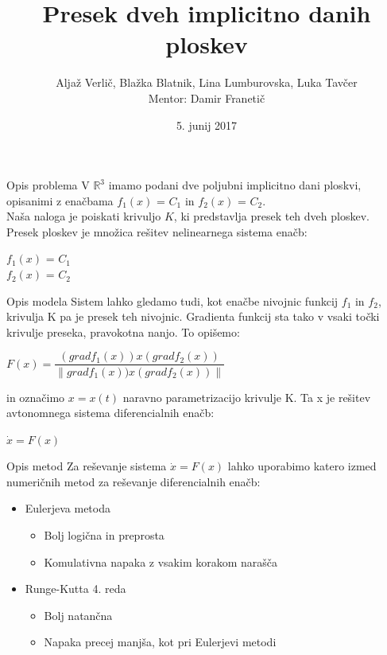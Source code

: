 \documentclass{beamer}
\title{Presek dveh implicitno danih ploskev}
\author[Avtorji]{Aljaž Verlič, Blažka Blatnik, Lina Lumburovska, Luka Tavčer\\
	Mentor: Damir Franetič}
\date{5. junij 2017}
\begin{document}
	
	\begin{frame}
		\titlepage
	\end{frame}
	
	\begin{frame}{Opis problema}
		V $\mathbb{R}^3$ imamo podani dve poljubni implicitno dani ploskvi, opisanimi z enačbama $f_{1}(x)$ = $C_{1}$ in $f_{2}(x)$ = $C_{2}$.\\
		Naša naloga je poiskati krivuljo $K$, ki predstavlja presek teh dveh ploskev.\\
		\vspace{5mm}
		Presek ploskev je množica rešitev nelinearnega sistema enačb:
		\begin{center}
			$f_{1}(x)$ = $C_{1}$\\$f_{2}(x)$ = $C_{2}$
		\end{center}
	\end{frame}
	
	\begin{frame}{Opis modela}
		Sistem lahko gledamo tudi, kot enačbe nivojnic funkcij  $f_{1}$ in $f_{2}$, krivulja K pa je presek teh nivojnic. Gradienta funkcij sta tako v vsaki točki krivulje preseka, pravokotna nanjo. To opišemo:
		\begin{center}
			$F(x) = \dfrac{(grad f_{1}(x))x (grad f_{2}(x))}{\|grad f_{1}(x))x (grad f_{2}(x))\|}$
		\end{center}
		in označimo $x = x(t)$ naravno parametrizacijo krivulje K. Ta x je rešitev avtonomnega sistema diferencialnih enačb:
		\begin{center}
			$\dot{x} = F(x)$
		\end{center}
	\end{frame}
	
	\begin{frame}{Opis metod}
		Za reševanje sistema $\dot{x} = F(x)$ lahko uporabimo katero izmed numeričnih metod za reševanje diferencialnih enačb:
		\begin{itemize}
			\item Eulerjeva metoda
			\begin{itemize}
				\item Bolj logična in preprosta
				\item Komulativna napaka z vsakim korakom narašča
			\end{itemize}
			\item Runge-Kutta 4. reda
			\begin{itemize}
				\item Bolj natančna
				\item Napaka precej manjša, kot pri Eulerjevi metodi
			\end{itemize}
		\end{itemize}
	\end{frame}
	
\end{document}
